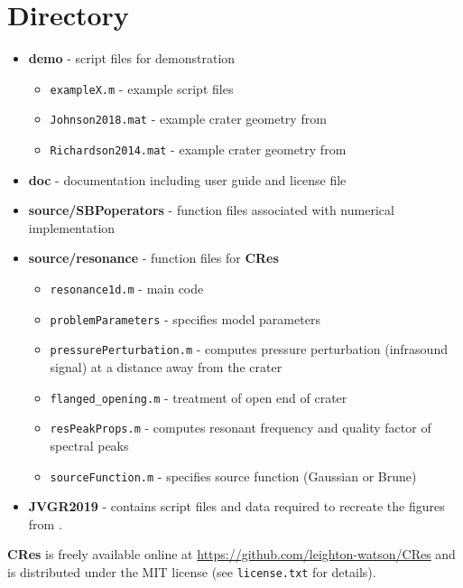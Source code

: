 \documentclass[10pt]{article}
\begin{document}
\section{Directory}
\begin{itemize}
\item {\bf demo} - script files for demonstration
\begin{itemize}
\item \texttt{exampleX.m} - example script files
\item \texttt{Johnson2018.mat} - example crater geometry from \citet{Johnson2018}
\item \texttt{Richardson2014.mat} - example crater geometry from \citet{Richardson2014}
\end{itemize}

\item {\bf doc} - documentation including user guide and license file
\item{\bf source/SBPoperators} - function files associated with numerical implementation
\item {\bf source/resonance} - function files for {\bf CRes}
\begin{itemize}
\item \texttt{resonance1d.m} - main code
\item \texttt{problemParameters} - specifies model parameters
\item \texttt{pressurePerturbation.m} - computes pressure perturbation (infrasound signal) at a distance away from the crater
\item \texttt{flanged\_opening.m} - treatment of open end of crater
\item \texttt{resPeakProps.m} - computes resonant frequency and quality factor of spectral peaks
\item \texttt{sourceFunction.m} - specifies source function (Gaussian or Brune)
\end{itemize}

\item {\bf JVGR2019} - contains script files and data required to recreate the figures from \citet{Watson2019_infrasonicresonance}.
\end{itemize}

{\bf CRes} is freely available online at \href{https://github.com/leighton-watson/CRes}{https://github.com/leighton-watson/CRes} and is distributed under the MIT license (see \texttt{license.txt} for details). 

\end{document}
